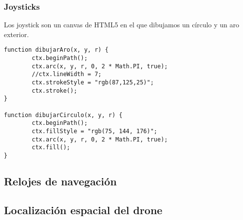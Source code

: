 \subsubsection{Joysticks}

Los joystick son un canvas de HTML5 en el que dibujamos un círculo y un aro exterior. 

\begin{lstlisting}[caption=Aro y círculo del joystick.]
function dibujarAro(x, y, r) {
        ctx.beginPath();
        ctx.arc(x, y, r, 0, 2 * Math.PI, true);
        //ctx.lineWidth = 7;
        ctx.strokeStyle = "rgb(87,125,25)";
        ctx.stroke();
}

function dibujarCirculo(x, y, r) {
        ctx.beginPath();
        ctx.fillStyle = "rgb(75, 144, 176)";
        ctx.arc(x, y, r, 0, 2 * Math.PI, true);
        ctx.fill();
}
\end{lstlisting}


\subsection{Relojes de navegación}\label{subsec:relojesnavegacion}
\subsection{Localización espacial del drone}







